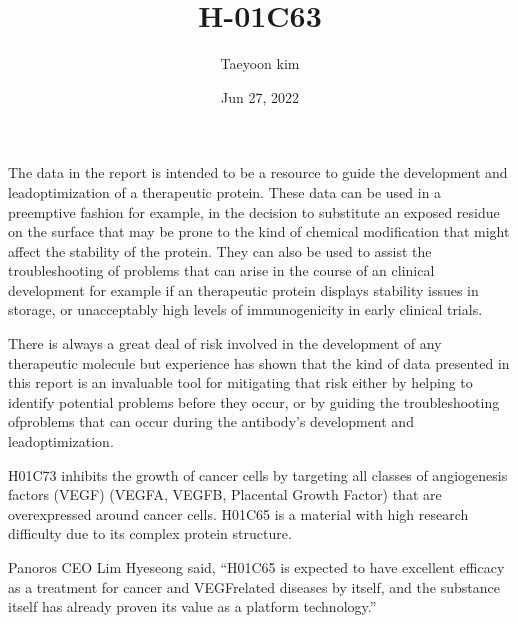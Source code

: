 \documentclass[letterpaper,10pt,english]{jupyterBook}
\title{H-01C63}
\date{Jun 27, 2022}
\author{Taeyoon kim}
\begin{document}
\pagestyle{empty}
\sphinxmaketitle
\pagestyle{plain}
\sphinxtableofcontents
\pagestyle{normal}
\label{\detokenize{intro::doc}}


\begin{DUlineblock}{0em}
\item[] 
\end{DUlineblock}

\sphinxAtStartPar
The data in the report is intended to be a resource to guide the development and lead\sphinxhyphen{}optimization of a therapeutic protein. These data can be used in a preemptive fashion \sphinxhyphen{} for example, in the decision to substitute an exposed residue on the surface that may be prone to the kind of chemical modification that might affect the stability of the protein. They can also be used to assist the troubleshooting of problems that can arise in the course of an clinical development \sphinxhyphen{} for example if an therapeutic protein displays stability issues in storage, or unacceptably high levels of immunogenicity in early clinical trials.

\sphinxAtStartPar
There is always a great deal of risk involved in the development of any therapeutic molecule but experience has shown that the kind of data presented in this report is an invaluable tool for mitigating that risk \sphinxhyphen{} either by helping to identify potential problems before they occur, or by guiding the troubleshooting ofproblems that can occur during the antibody’s development and lead\sphinxhyphen{}optimization.

\begin{DUlineblock}{0em}
\item[] 
\end{DUlineblock}

\sphinxAtStartPar
H\sphinxhyphen{}01C73 inhibits the growth of cancer cells by targeting all classes of angiogenesis factors (VEGF) (VEGF\sphinxhyphen{}A, VEGF\sphinxhyphen{}B, Placental Growth Factor) that are overexpressed around cancer cells. H\sphinxhyphen{}01C65 is a material with high research difficulty due to its complex protein structure.

\sphinxAtStartPar
Panoros CEO Lim Hye\sphinxhyphen{}seong said, “H\sphinxhyphen{}01C65 is expected to have excellent efficacy as a treatment for cancer and VEGF\sphinxhyphen{}related diseases by itself, and the substance itself has already proven its value as a platform technology.”
\end{document}
